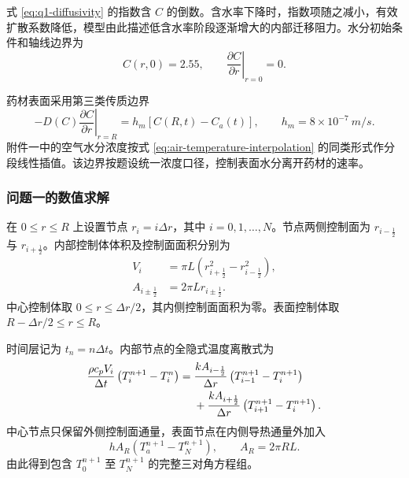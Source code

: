 \documentclass[withoutpreface,bwprint]{cumcmthesis}
\begin{document}
式 \ref{eq:q1-diffusivity} 的指数含 \(C\) 的倒数。含水率下降时，指数项随之减小，有效扩散系数降低，模型由此描述低含水率阶段逐渐增大的内部迁移阻力。水分初始条件和轴线边界为
\begin{equation}
C(r,0)=2.55,\qquad
\left.\frac{\partial C}{\partial r}\right|_{r=0}=0.
\label{eq:moisture-initial-center}
\end{equation}

药材表面采用第三类传质边界
\begin{equation}
-D(C)\left.\frac{\partial C}{\partial r}\right|_{r=R}
=h_m\left[C(R,t)-C_a(t)\right],
\qquad h_m=8\times10^{-7}\ \si{m/s}.
\label{eq:moisture-surface}
\end{equation}
附件一中的空气水分浓度按式 \ref{eq:air-temperature-interpolation} 的同类形式作分段线性插值。该边界按题设统一浓度口径，控制表面水分离开药材的速率。

\subsubsection{问题一的数值求解}

在 \(0\leq r\leq R\) 上设置节点 \(r_i=i\Delta r\)，其中 \(i=0,1,\ldots,N\)。节点两侧控制面为 \(r_{i-\frac12}\) 与 \(r_{i+\frac12}\)。内部控制体体积及控制面面积分别为
\begin{align}
V_i&=\pi L
\left(
r_{i+\frac12}^{2}-r_{i-\frac12}^{2}
\right),\\
A_{i\pm\frac12}&=2\pi Lr_{i\pm\frac12}.
\label{eq:fvm-geometry}
\end{align}
中心控制体取 \(0\leq r\leq \Delta r/2\)，其内侧控制面面积为零。表面控制体取 \(R-\Delta r/2\leq r\leq R\)。

时间层记为 \(t_n=n\Delta t\)。内部节点的全隐式温度离散式为
\begin{align}
\frac{\rho c_pV_i}{\Delta t}
\left(T_i^{n+1}-T_i^n\right)
={}&
\frac{kA_{i-\frac12}}{\Delta r}
\left(T_{i-1}^{n+1}-T_i^{n+1}\right)\notag\\
&+
\frac{kA_{i+\frac12}}{\Delta r}
\left(T_{i+1}^{n+1}-T_i^{n+1}\right).
\label{eq:heat-fvm}
\end{align}
中心节点只保留外侧控制面通量，表面节点在内侧导热通量外加入
\begin{equation}
hA_R\left(T_a^{n+1}-T_N^{n+1}\right),
\qquad A_R=2\pi RL.
\label{eq:surface-heat-flux}
\end{equation}
由此得到包含 \(T_0^{n+1}\) 至 \(T_N^{n+1}\) 的完整三对角方程组。
\end{document}
